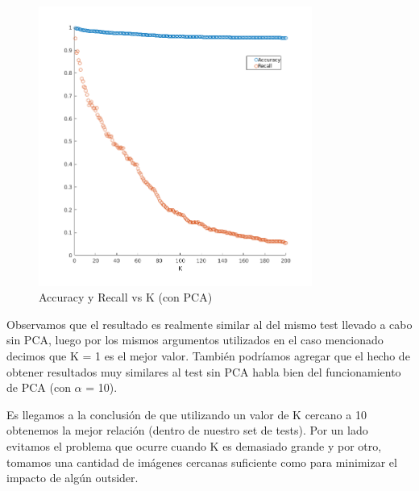 \begin{figure}[H]
	\centering
	\includegraphics[width=0.8\textwidth]{img/Acc_recall_k_pca.png}
	\caption{Accuracy y Recall vs K (con PCA)}
	\label{fig: Accuracy y Recall vs K (con PCA)}
\end{figure}
Observamos que el resultado es realmente similar al del mismo test llevado a cabo sin PCA, luego por los mismos argumentos utilizados en el caso mencionado decimos que K = 1 es el mejor valor.
También podríamos agregar que el hecho de obtener resultados muy similares al test sin PCA habla bien del funcionamiento de PCA (con $\alpha$ = 10).

Es llegamos a la conclusión de que utilizando un valor de K cercano a 10 obtenemos la mejor relación (dentro de nuestro set de tests).
Por un lado evitamos el problema que ocurre cuando K es demasiado grande y por otro, tomamos una cantidad de imágenes cercanas suficiente como para minimizar el impacto de algún outsider.


